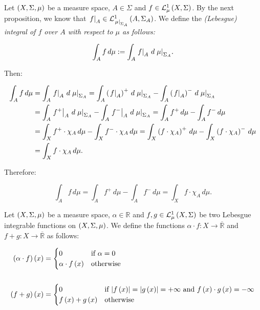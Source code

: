 \begin{remark}
  Let $\pr{X,\Sigma,\mu}$ be a measure space, $A\in\Sigma$ and $f\in\Leb{X}{\Sigma}{\mu}$. By the next proposition, we know that $\rest{f}{A}\in\Leb{A}{\Sigma_A}{\rest{\mu}{\Sigma_A}}$. We define the \emph{(Lebesgue) integral of $f$ over $A$ with respect to $\mu$ as follows:}

  \begin{equation}
    \int_{A}{f\,d\mu}:=\int_{A}{\rest{f}{A}\,d\rest{\mu}{\Sigma_A}}.
  \end{equation}

  Then:

  \begin{equation}
    \begin{split}
      \int_{A}{f\,d\mu} & =\int_{A}{\rest{f}{A}\,d\rest{\mu}{\Sigma_A}}=\int_{A}{\pr{\rest{f}{A}}^+\,d\rest{\mu}{\Sigma_A}}-\int_{A}{\pr{\rest{f}{A}}^-\,d\rest{\mu}{\Sigma_A}}\\
      & =\int_{A}{\rest{f^+}{A}\,d\rest{\mu}{\Sigma_A}}-\int_{A}{\rest{f^-}{A}\,d\rest{\mu}{\Sigma_A}}=\int_{A}{f^+\,d\mu}-\int_{A}{f^-\,d\mu}\\
      & =\int_{X}{f^+\cdot\chi_A\,d\mu}-\int_{X}{f^-\cdot\chi_A\,d\mu}=\int_{X}{\pr{f\cdot\chi_A}^+\,d\mu}-\int_{X}{\pr{f\cdot\chi_A}^-\,d\mu}\\
      & =\int_{X}{f\cdot\chi_A\,d\mu}.
    \end{split}
  \end{equation}

  Therefore:

  \begin{equation}
    \int_{A}{f\,d\mu}=\int_{A}{f^+\,d\mu}-\int_{A}{f^-\,d\mu}=\int_{X}{f\cdot\chi_A\,d\mu}.
  \end{equation}
\end{remark}

\begin{remark}
  Let $\pr{X,\Sigma,\mu}$ be a measure space, $\alpha\in\mathbb{R}$ and $f,g\in\Leb{X}{\Sigma}{\mu}$ be two Lebesgue integrable functions on $\pr{X,\Sigma,\mu}$. We define the functions $\alpha\cdot f:X\rightarrow\overline{\mathbb{R}}$ and $f+g:X\rightarrow\overline{\mathbb{R}}$ as follows:

  \begin{equation}
    \begin{split}
      \pr{\alpha\cdot f}\pr{x} & =\begin{cases}
      0 & \text{if $\alpha=0$}\\
      \alpha\cdot f\pr{x} & \text{otherwise}
    \end{cases}\\\\
    \pr{f+g}\pr{x} & =\begin{cases}
      0 & \text{if $\bars{f\pr{x}}=\bars{g\pr{x}}=+\infty$ and $f\pr{x}\cdot g\pr{x}=-\infty$}\\
      f\pr{x}+g\pr{x} & \text{otherwise}
    \end{cases}
    \end{split}
  \end{equation}
\end{remark}

